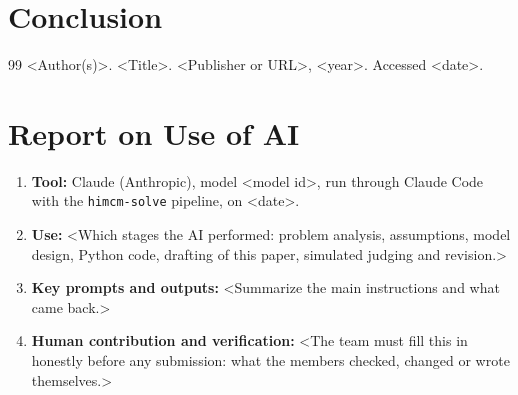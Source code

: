 \documentclass[12pt]{article}
\begin{document}
\section{Conclusion}

\begin{thebibliography}{99}
 <Author(s)>. <Title>. <Publisher or URL>, <year>. Accessed <date>.
\end{thebibliography}

\clearpage
\section*{Report on Use of AI}
\begin{enumerate}[leftmargin=*]
  \item \textbf{Tool:} Claude (Anthropic), model <model id>, run through Claude Code with the
        \texttt{himcm-solve} pipeline, on <date>.
  \item \textbf{Use:} <Which stages the AI performed: problem analysis, assumptions, model
        design, Python code, drafting of this paper, simulated judging and revision.>
  \item \textbf{Key prompts and outputs:} <Summarize the main instructions and what came back.>
  \item \textbf{Human contribution and verification:} <The team must fill this in honestly
        before any submission: what the members checked, changed or wrote themselves.>
\end{enumerate}
\end{document}
